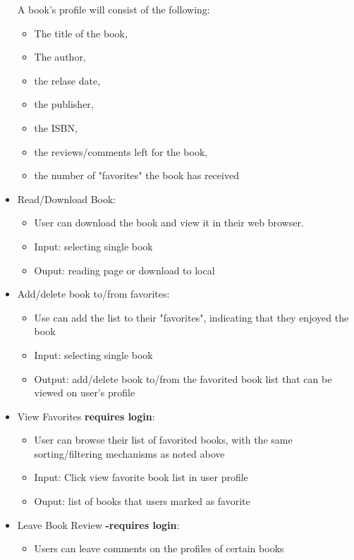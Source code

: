 \documentclass[letter, 12pt, titlepage]{article}
\begin{document}
\begin{itemize}
	      A book's profile will consist of the following:
	      \begin{itemize}
		      \item The title of the book,
		      \item The author,
		      \item the relase date,
		      \item the publisher,
		      \item the ISBN,
		      \item the reviews/comments left for the book,
		      \item the number of "favorites" the book has received
	      \end{itemize}
	\item Read/Download Book:
	      \begin{itemize}
		      \item  User can download the book and view it in their web browser.
		      \item  Input: selecting single book
		      \item  Ouput: reading page or download to local
	      \end{itemize}
	\item Add/delete book to/from favorites:
	      \begin{itemize}
		      \item  Use can add the list to their "favorites", indicating that they enjoyed the book
		      \item  Input: selecting single book
		      \item  Output: add/delete book to/from the favorited book list that can be viewed on user's profile
	      \end{itemize}
	\item  View Favorites  \textbf{requires login}:
	      \begin{itemize}
		      \item  User can browse their list of favorited books, with the same sorting/filtering mechanisms as noted above
		      \item  Input: Click view favorite book list in user profile
		      \item  Ouput: list of books that users marked as favorite
	      \end{itemize}
	\item Leave Book Review \textbf{-requires login}:
	      \begin{itemize}
		      \item  Users can leave comments on the profiles of certain books

\end{itemize}
\end{itemize}
\end{document}
